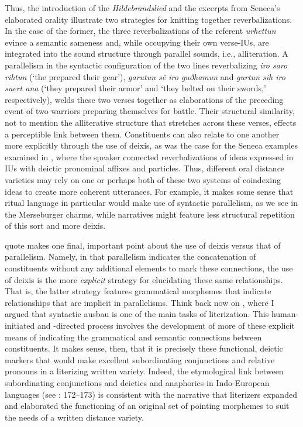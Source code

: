 \noindent Thus, the introduction of the \textit{Hildebrandslied} and the excerpts from Seneca’s elaborated orality illustrate two strategies for knitting together reverbalizations. In the case of the former, the three reverbalizations of the referent \textit{urhettun} evince a semantic sameness and, while occupying their own verse-IUs, are integrated into the sound structure through parallel sounds, i.e., alliteration. A parallelism in the syntactic configuration of the two lines reverbalizing \textit{iro saro rihtun} (‘the prepared their gear’), \textit{garutun sê iro guðhamun} and \textit{gurtun sih iro suert ana} (‘they prepared their armor’ and ‘they belted on their swords,’ respectively), welds these two verses together as elaborations of the preceding event of two warriors preparing themselves for battle. Their structural similarity, not to mention the alliterative structure that stretches across these verses, effects a perceptible link between them. Constituents can also relate to one another more explicitly through the use of deixis, as was the case for the Seneca examples examined in , where the speaker connected reverbalizations of ideas expressed in IUs with deictic pronominal affixes and particles. Thus, different oral distance varieties may rely on one or perhaps both of these two systems of coindexing ideas to create more coherent utterances. For example, it makes some sense that ritual language in particular would make use of syntactic parallelism, as we see in the Merseburger charms, while narratives might feature less structural repetition of this sort and more deixis.

 quote makes one final, important point about the use of deixis versus that of parallelism. Namely, in that parallelism indicates the concatenation of constituents without any additional elements to mark these connections, the use of deixis is the more \textit{explicit} strategy for elucidating these same relationships. That is, the latter strategy features grammatical morphemes that indicate relationships that are implicit in parallelisms. Think back now on , where I argued that syntactic ausbau is one of the main tasks of literization. This human-initiated and -directed process involves the development of more of these explicit means of indicating the grammatical and semantic connections between constituents. It makes sense, then, that it is precisely these functional, deictic markers that would make excellent subordinating conjunctions and relative pronouns in a literizing written variety. Indeed, the etymological link between subordinating conjunctions and deictics and anaphorics in Indo-European languages (see \citealt{Clackson2007}: 172--173) is consistent with the narrative that literizers expanded and elaborated the functioning of an original set of pointing morphemes to suit the needs of a written distance variety.

